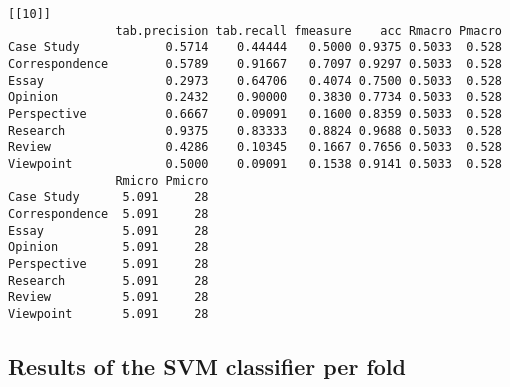 \documentclass[]{article}
\begin{document}
\begin{lstlisting}[frame=single]
[[10]]
               tab.precision tab.recall fmeasure    acc Rmacro Pmacro
Case Study            0.5714    0.44444   0.5000 0.9375 0.5033  0.528
Correspondence        0.5789    0.91667   0.7097 0.9297 0.5033  0.528
Essay                 0.2973    0.64706   0.4074 0.7500 0.5033  0.528
Opinion               0.2432    0.90000   0.3830 0.7734 0.5033  0.528
Perspective           0.6667    0.09091   0.1600 0.8359 0.5033  0.528
Research              0.9375    0.83333   0.8824 0.9688 0.5033  0.528
Review                0.4286    0.10345   0.1667 0.7656 0.5033  0.528
Viewpoint             0.5000    0.09091   0.1538 0.9141 0.5033  0.528
               Rmicro Pmicro
Case Study      5.091     28
Correspondence  5.091     28
Essay           5.091     28
Opinion         5.091     28
Perspective     5.091     28
Research        5.091     28
Review          5.091     28
Viewpoint       5.091     28
\end{lstlisting}

\subsection{Results of the SVM classifier per fold}
\end{document}
